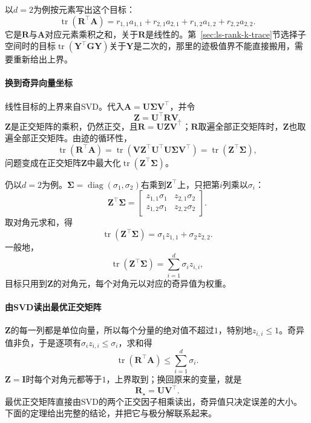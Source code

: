 以$d=2$为例按元素写出这个目标：
\[
 \operatorname{tr}(\bm R^\top\bm A)
 =r_{1,1}a_{1,1}+r_{2,1}a_{2,1}+r_{1,2}a_{1,2}+r_{2,2}a_{2,2}.
\]
它是$\bm R$与$\bm A$对应元素乘积之和，关于$\bm R$是线性的。第~\ref{sec:ls-rank-k-trace}节选择子空间时的目标$\operatorname{tr}(\bm Y^\top\bm G\bm Y)$关于$\bm Y$是二次的，那里的迹极值界不能直接搬用，需要重新给出上界。

\paragraph{换到奇异向量坐标}
线性目标的上界来自SVD。代入$\bm A=\bm U\bm\Sigma\bm V^\top$，并令
\[
 \bm Z=\bm U^\top\bm R\bm V .
\]
$\bm Z$是正交矩阵的乘积，仍然正交，且$\bm R=\bm U\bm Z\bm V^\top$；$\bm R$取遍全部正交矩阵时，$\bm Z$也取遍全部正交矩阵。由迹的循环性，
\[
 \operatorname{tr}(\bm R^\top\bm A)
 =\operatorname{tr}(\bm V\bm Z^\top\bm U^\top\bm U\bm\Sigma\bm V^\top)
 =\operatorname{tr}(\bm Z^\top\bm\Sigma),
\]
问题变成在正交矩阵$\bm Z$中最大化$\operatorname{tr}(\bm Z^\top\bm\Sigma)$。

仍以$d=2$为例。$\bm\Sigma=\operatorname{diag}(\sigma_1,\sigma_2)$右乘到$\bm Z^\top$上，只把第$i$列乘以$\sigma_i$：
\[
 \bm Z^\top\bm\Sigma
 =\begin{bmatrix}z_{1,1}\sigma_1&z_{2,1}\sigma_2\\z_{1,2}\sigma_1&z_{2,2}\sigma_2\end{bmatrix}.
\]
取对角元求和，得
\[
 \operatorname{tr}(\bm Z^\top\bm\Sigma)=\sigma_1z_{1,1}+\sigma_2z_{2,2}.
\]
一般地，
\[
 \operatorname{tr}(\bm Z^\top\bm\Sigma)=\sum_{i=1}^d\sigma_iz_{i,i},
\]
目标只用到$\bm Z$的对角元，每个对角元以对应的奇异值为权重。

\paragraph{由SVD读出最优正交矩阵}
$\bm Z$的每一列都是单位向量，所以每个分量的绝对值不超过$1$，特别地$z_{i,i}\leq1$。奇异值非负，于是逐项有$\sigma_iz_{i,i}\leq\sigma_i$，求和得
\[
 \operatorname{tr}(\bm R^\top\bm A)\leq\sum_{i=1}^d\sigma_i .
\]
$\bm Z=\bm I$时每个对角元都等于$1$，上界取到；换回原来的变量，就是
\begin{equation}
 \bm R_\star=\bm U\bm V^\top .
 \label{eq:matrix-approximation-orthogonal-optimum}
\end{equation}
最优正交矩阵直接由SVD的两个正交因子相乘读出，奇异值只决定误差的大小。下面的定理给出完整的结论，并把它与极分解联系起来。

